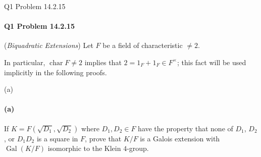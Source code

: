 \documentclass[12pt]{article}
\newenvironment{fullbox}{\begin{lrbox}{\savefullbox}\begin{minipage}{\dimexpr\textwidth-2\fboxsep\relax}}{\end{minipage}\end{lrbox}\begin{center}\framebox[\textwidth]{\usebox{\savefullbox}}\end{center}}
\newenvironment{pbox}[1][]{\begin{fullbox}\ifx#1\empty\else\paragraph{#1}\fi}{\end{fullbox}}
\theoremstyle{definition}
\newcommand{\<}{\langle}
\renewcommand{\>}{\rangle}
\DeclareMathOperator{\Gal}{Gal}
\begin{document}
\thispagestyle{title}


\begin{pbox}[Q1 Problem 14.2.15]
    (\textit{Biquadratic Extensions}) Let $F$ be a field of characteristic $\ne 2$.
\end{pbox}

In particular, $\operatorname{char}F \ne 2$ implies that $2 = 1_F + 1_F \in F^\times$; this fact will be used implicitly in the following proofs. 

\begin{pbox}[(a)]
    If $K = F(\sqrt{D_1}, \sqrt{D_2})$ where $D_1, D_2 \in F$ have the property that none of $D_1$, $D_2$, or $D_1D_2$ is a square in $F$, prove that $K/F$ is a Galois extension with $\Gal(K/F)$ isomorphic to the Klein $4$-group.
\end{pbox}
\end{document}
